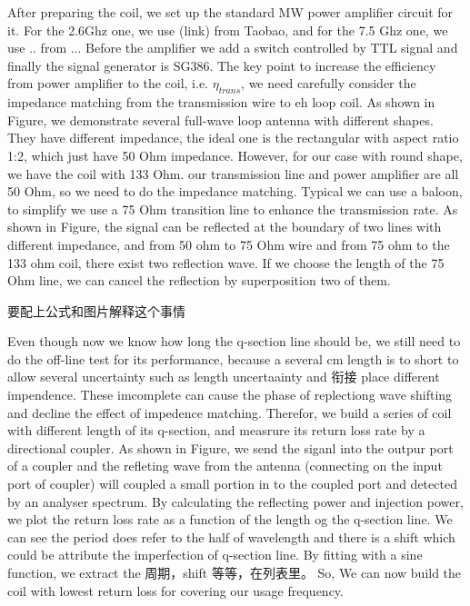 After preparing the coil, we set up the standard MW power amplifier circuit for it. For the 2.6Ghz one, we use (link) from Taobao, and for the 7.5 Ghz one, we use .. from ... Before the amplifier we add a switch controlled by TTL signal and finally the signal generator is SG386. The key point to increase the efficiency from power amplifier to the coil, i.e. \(\eta_{trans}\), we need carefully consider the impedance matching from the transmission wire to eh loop coil. As shown in Figure, we demonstrate several full-wave loop antenna with different shapes. They have different impedance, the ideal one is the rectangular with aspect ratio 1:2, which just have 50 Ohm impedance. However, for our case with round shape, we have the coil with 133 Ohm. our transmission line and power amplifier are all 50 Ohm, so we need to do the impedance matching. Typical we can use a baloon, to simplify we use a 75 Ohm transition line to enhance the transmission rate. As shown in Figure, the signal can be reflected at the boundary of two lines with different impedance, and from 50 ohm to 75 Ohm wire and from 75 ohm to the 133 ohm coil, there exist two reflection wave. If we choose the length of the 75 Ohm line, we can cancel the reflection by superposition two of them. 

要配上公式和图片解释这个事情

Even though now we know how long the q-section line should be, we still need to do the off-line test for its performance, because a several cm length is to short to allow several uncertainty such as length uncertaainty and 衔接 place different impendence. These imcomplete can cause the phase of replectiong wave shifting and decline the effect of impedence matching. Therefor, we build a series of coil with different length of its q-section, and measrure its return loss rate by a directional coupler. As shown in Figure, we send the siganl into the outpur port of a coupler and the refleting wave from the antenna (connecting on the input port of coupler) will coupled a small portion in to the coupled port and detected by an analyser spectrum. By calculating the reflecting power and injection power, we plot the return loss rate as a function of the length og the q-section line. We can see the period does refer to the half of wavelength and there is a shift which could be attribute the imperfection of q-section line. By fitting with a sine function, we extract the 周期，shift 等等，在列表里。 So, We can now build the coil with lowest return loss for covering our usage frequency.

